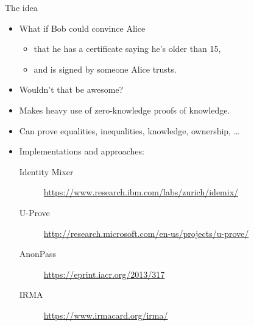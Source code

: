 \begin{frame}
  \begin{block}{The idea}
    \begin{itemize}
      \item What if Bob could convince Alice
        \begin{itemize}
          \item that he has a certificate saying he's older than 15,
          \item and is signed by someone Alice trusts.
        \end{itemize}
      \item Wouldn't that be awesome?
    \end{itemize}
  \end{block}
\end{frame}

\begin{frame}
  \begin{example}
    \begin{itemize}
      \item Makes heavy use of zero-knowledge proofs of knowledge.
      \item Can prove equalities, inequalities, knowledge, ownership, \dots
      \item Implementations and approaches:
        \begin{description}
          \item[Identity Mixer]
            \url{https://www.research.ibm.com/labs/zurich/idemix/}
          \item[U-Prove]
            \url{http://research.microsoft.com/en-us/projects/u-prove/}
          \item[AnonPass]
            \url{https://eprint.iacr.org/2013/317}
          \item[IRMA]
            \url{https://www.irmacard.org/irma/}
        \end{description}
    \end{itemize}
  \end{example}
\end{frame}




\begin{frame}[allowframebreaks]
	\small
  \printbibliography{}
\end{frame}

